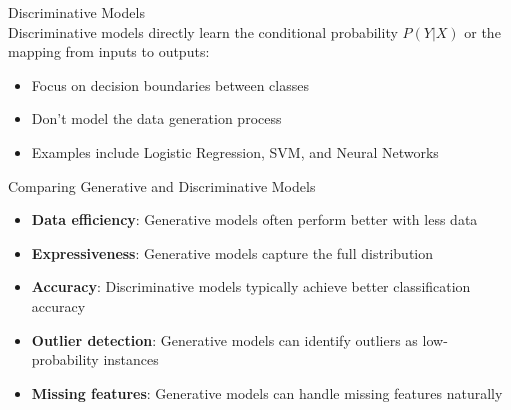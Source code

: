 \begin{definition}{Discriminative Models}\\
Discriminative models directly learn the conditional probability $P(Y|X)$ or the mapping from inputs to outputs:
\begin{itemize}
    \item Focus on decision boundaries between classes
    \item Don't model the data generation process
    \item Examples include Logistic Regression, SVM, and Neural Networks
\end{itemize}
\end{definition}

\begin{concept}{Comparing Generative and Discriminative Models}
\begin{itemize}
    \item \textbf{Data efficiency}: Generative models often perform better with less data
    \item \textbf{Expressiveness}: Generative models capture the full distribution
    \item \textbf{Accuracy}: Discriminative models typically achieve better classification accuracy
    \item \textbf{Outlier detection}: Generative models can identify outliers as low-probability instances
    \item \textbf{Missing features}: Generative models can handle missing features naturally
\end{itemize}
\end{concept}

